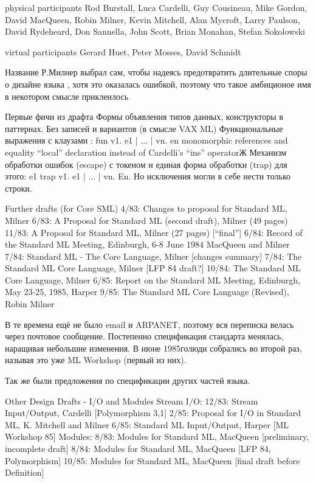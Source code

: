 \documentclass[14pt]{matmex-diploma-custom}
\begin{document}
\begin{itemize}
\begin{itemize}
physical participants
Rod Burstall, Luca Cardelli, Guy Cousineau, Mike Gordon, David MacQueen, Robin Milner, Kevin Mitchell, Alan Mycroft, Larry Paulson, David Rydeheard, Don Sannella, John Scott, Brian Monahan, Stefan Sokolowski

virtual participants
Gerard Huet, Peter Mosses, David Schmidt

Название Р.Милнер выбрал сам, чтобы надеясь предотвратить длительные споры о дизайне языка , хотя это оказалась ошибкой, поэтому что такое амбиционое имя в некотором смысле приклеилось

Первые фичи из драфта
Формы объявления типов данных, конструкторы в паттернах.
Без записей и вариантов (в смысле VAX ML)
Функциональные выражения с клаузами :  fun v1. e1 | ... | vn. en
monomorphic references and equality
“local” declaration instead of Cardelli’s “ins” operatorЖ
Механизм обработки ошибок (escape) с токеном и единая форма обработки (trap) для этого:
e1 trap v1. e1 | ... | vn. En. Но исключения могли в себе нести только строки.


Further drafts (for Core SML)
4/83: Changes to proposal for Standard ML, Milner
6/83: A Proposal for Standard ML (second draft), Milner (49 pages)
11/83: A Proposal for Standard ML, Milner (27 pages) [“final”]
6/84: Record of the Standard ML Meeting, Edinburgh, 6-8 June 1984
MacQueen and Milner
7/84: Standard ML - The Core Language, Milner [changes summary]
7/84: The Standard ML Core Language, Milner [LFP 84 draft?]
10/84: The Standard ML Core Language, Milner
6/85: Report on the Standard ML Meeting, Edinburgh, May 23-25, 1985, Harper
9/85: The Standard ML Core Language (Revised), Robin Milner

В те времена ещё не было email и ARPANET, поэтому вся переписка велась через почтовое сообщение. Постепенно спецификация стандарта менялась, наращивая небольшие изменения. В июне 1985голюди собрались во второй раз, называя это уже ML Workshop (первый из них).

Так же были предложения по спецификации  других частей языка.

Other Design Drafts - I/O and Modules
Stream I/O:
12/83: Stream Input/Output, Cardelli [Polymorphism 3,1]
2/85: Proposal for I/O in Standard ML, K. Mitchell and Milner
6/85: Standard ML Input/Output, Harper [ML Workshop 85]
Modules:
8/83: Modules for Standard ML, MacQueen [preliminary, incomplete draft]
8/84: Modules for Standard ML, MacQueen [LFP 84, Polymorphism]
10/85: Modules for Standard ML, MacQueen [final draft before Definition]





\end{itemize}
\end{itemize}
\end{document}
